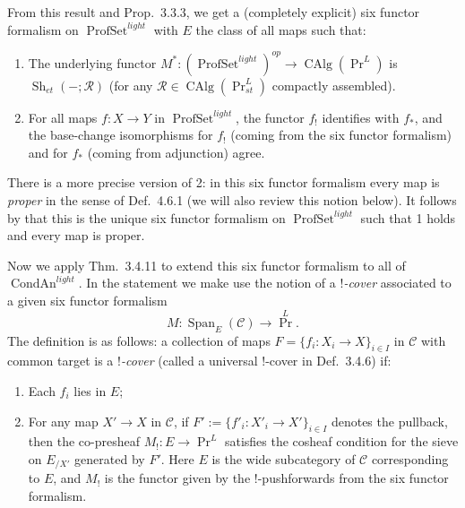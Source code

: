 \documentclass[12pt]{article}
\newcommand{\on}{\operatorname}
\begin{document}
From this result and \cite{HeyerSixFunctors} Prop.\ 3.3.3, we get a (completely explicit) six functor formalism on $\on{ProfSet}^{light}$ with $E$ the class of all maps such that:
\begin{enumerate}
\item The underlying functor $M^\ast:(\on{ProfSet}^{light})^{op}\to\on{CAlg}(\on{Pr}^L)$ is $\on{Sh}_{et}(-;\mathcal{R})$ (for any $\mathcal{R}\in\on{CAlg}(\on{Pr}^L_{st})$ compactly assembled).
\item For all maps $f:X\to Y$ in $\on{ProfSet}^{light}$, the functor $f_!$ identifies with $f_\ast$, and the base-change isomorphisms for $f_!$ (coming from the six functor formalism) and for $f_\ast$ (coming from adjunction) agree.
\end{enumerate}
There is a more precise version of 2: in this six functor formalism every map is \emph{proper} in the sense of \cite{HeyerSixFunctors} Def.\ 4.6.1 (we will also review this notion below).  It follows by \cite{DauserUniqueness} that this is the unique six functor formalism on $\on{ProfSet}^{light}$ such that 1 holds and every map is proper.

Now we apply \cite{HeyerSixFunctors} Thm.\ 3.4.11 to extend this six functor formalism to all of $\on{CondAn}^{light}$.  In the statement we make use the notion of a \emph{$!$-cover} associated to a given six functor formalism
$$M:\on{Span}_E(\mathcal{C})\to\on{Pr}^L.$$
The definition is as follows:  a collection of maps $F=\{f_i:X_i\to X\}_{i\in I}$ in $\mathcal{C}$ with common target is a \emph{$!$-cover} (called a universal $!$-cover in \cite{HeyerSixFunctors} Def.\ 3.4.6) if:
\begin{enumerate}
\item Each $f_i$ lies in $E$;
\item For any map $X'\to X$ in $\mathcal{C}$, if $F':=\{f'_i: X'_i\to X'\}_{i\in I}$ denotes the pullback, then the co-presheaf $M_!: E \to \on{Pr}^L$ satisfies the cosheaf condition for the sieve on $E_{/X'}$ generated by $F'$.  Here $E$ is the wide subcategory of $\mathcal{C}$ corresponding to $E$, and $M_!$ is the functor given by the $!$-pushforwards from the six functor formalism.
\end{enumerate}
\end{document}
